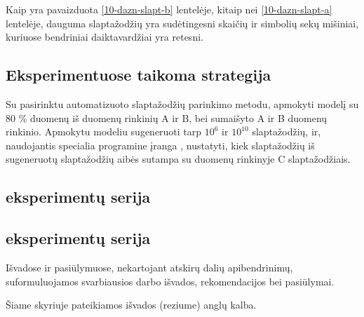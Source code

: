 \documentclass{VUMIFInfBakalaurinis}
\begin{document}
Kaip yra pavaizduota \ref{10-dazn-slapt-b} lentelėje, kitaip nei 
\ref{10-dazn-slapt-a} lentelėje, dauguma slaptažodžių yra sudėtingesni skaičių 
ir simbolių sekų mišiniai, kuriuose bendriniai daiktavardžiai yra retesni.



\subsection{Eksperimentuose taikoma strategija}
Su pasirinktu automatizuoto slaptažodžių parinkimo metodu, apmokyti modelį su 80 
\% duomenų iš duomenų rinkinių A ir B, bei sumaišyto A ir B duomenų rinkinio. 
Apmokytu modeliu sugeneruoti tarp $10^{6}$ ir $10^{10}$ slaptažodžių, ir, 
naudojantis specialia programine įranga , nustatyti, kiek 
slaptažodžių iš sugeneruotų slaptažodžių aibės sutampa su duomenų rinkinyje C 
slaptažodžiais.

\subsection{ eksperimentų serija}

\subsection{ eksperimentų serija}

Išvadose ir pasiūlymuose, nekartojant atskirų dalių apibendrinimų,
suformuluojamos svarbiausios darbo išvados, rekomendacijos bei pasiūlymai.

Šiame skyriuje pateikiamos išvados (reziume) anglų kalba.
\end{document}
